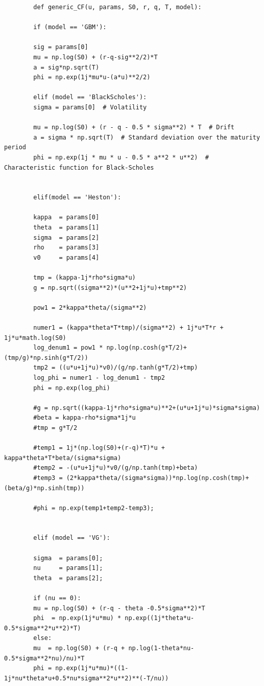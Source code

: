 \documentclass[margin=1in]{article}
\begin{document}
\begin{lstlisting}
       	def generic_CF(u, params, S0, r, q, T, model):
       	
       	if (model == 'GBM'):
       	
       	sig = params[0]
       	mu = np.log(S0) + (r-q-sig**2/2)*T
       	a = sig*np.sqrt(T)
       	phi = np.exp(1j*mu*u-(a*u)**2/2)
       	
       	elif (model == 'BlackScholes'):
       	sigma = params[0]  # Volatility
       	
       	mu = np.log(S0) + (r - q - 0.5 * sigma**2) * T  # Drift
       	a = sigma * np.sqrt(T)  # Standard deviation over the maturity period
       	phi = np.exp(1j * mu * u - 0.5 * a**2 * u**2)  # Characteristic function for Black-Scholes
       	
       	
       	elif(model == 'Heston'):
       	
       	kappa  = params[0]
       	theta  = params[1]
       	sigma  = params[2]
       	rho    = params[3]
       	v0     = params[4]
       	
       	tmp = (kappa-1j*rho*sigma*u)
       	g = np.sqrt((sigma**2)*(u**2+1j*u)+tmp**2)
       	
       	pow1 = 2*kappa*theta/(sigma**2)
       	
       	numer1 = (kappa*theta*T*tmp)/(sigma**2) + 1j*u*T*r + 1j*u*math.log(S0)
       	log_denum1 = pow1 * np.log(np.cosh(g*T/2)+(tmp/g)*np.sinh(g*T/2))
       	tmp2 = ((u*u+1j*u)*v0)/(g/np.tanh(g*T/2)+tmp)
       	log_phi = numer1 - log_denum1 - tmp2
       	phi = np.exp(log_phi)
       	
       	#g = np.sqrt((kappa-1j*rho*sigma*u)**2+(u*u+1j*u)*sigma*sigma)
       	#beta = kappa-rho*sigma*1j*u
       	#tmp = g*T/2
       	
       	#temp1 = 1j*(np.log(S0)+(r-q)*T)*u + kappa*theta*T*beta/(sigma*sigma)
       	#temp2 = -(u*u+1j*u)*v0/(g/np.tanh(tmp)+beta)
       	#temp3 = (2*kappa*theta/(sigma*sigma))*np.log(np.cosh(tmp)+(beta/g)*np.sinh(tmp))
       	
       	#phi = np.exp(temp1+temp2-temp3);
       	
       	
       	elif (model == 'VG'):
       	
       	sigma  = params[0];
       	nu     = params[1];
       	theta  = params[2];
       	
       	if (nu == 0):
       	mu = np.log(S0) + (r-q - theta -0.5*sigma**2)*T
       	phi  = np.exp(1j*u*mu) * np.exp((1j*theta*u-0.5*sigma**2*u**2)*T)
       	else:
       	mu  = np.log(S0) + (r-q + np.log(1-theta*nu-0.5*sigma**2*nu)/nu)*T
       	phi = np.exp(1j*u*mu)*((1-1j*nu*theta*u+0.5*nu*sigma**2*u**2)**(-T/nu))
       	

\end{lstlisting}
\end{document}
